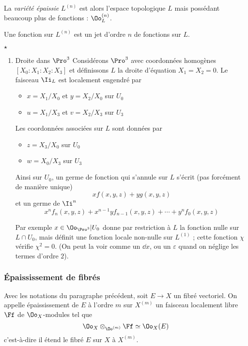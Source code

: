 \documentclass[a4paper]{amsart}
\begin{document}
La \emph{variété épaissie} \(L^{(n)}\) est alors l'espace topologique \(L\) mais possédant beaucoup plus de fonctions : \(\Oo^{(n)}_L\).

Une fonction sur \(L^{(n)}\) est un jet d'ordre \(n\) de fonctions sur \(L\).

{\color{DarkRed}\(\star\)}

\begin{enumerate}
\item Droite dans \(\Pro^3\)
\label{sec:orgd6f4a29}
Considérons \(\Pro^3\) avec coordonnées homogènes \([X_0:X_1:X_2:X_3]\) et définissons \(L\) la droite d'équation \(X_1=X_2= 0\). Le faisceau \(\Ii_L\) est localement engendré par
\begin{itemize}
\item \(x = X_1/X_0\) et \(y = X_2/X_0\) sur \(U_0\)
\item \(u = X_1/X_3\) et \(v = X_2/X_3\) sur \(U_3\)
\end{itemize}
Les coordonnées associées sur \(L\) sont données par
\begin{itemize}
\item \(z = X_3/X_0\) sur \(U_0\)
\item \(w = X_0/X_3\) sur \(U_3\)
\end{itemize}

Ainsi sur \(U_0\), un germe de fonction qui s'annule sur \(L\) s'écrit (pas forcément de manière unique)
\[
xf(x,y,z) + yg(x,y,z)
\]
et un germe de \(\Ii^n\)
\[
x^nf_n(x,y,z) + x^{n-1}yf_{n-1}(x,y,z) + \cdots + y^nf_0(x,y,z)
\]

Par exemple \(x \in \Oo_{\Pro^3}\vert U_0\) donne par restriction à \(L\) la fonction nulle sur \(L \cap U_0\), mais définit une fonction locale non-nulle sur \(L^{(1)}\) ; cette fonction \(\chi\) vérifie \(\chi^2 = 0\). (On peut la voir comme un \(\dd x\), ou un \(\varepsilon\) quand on néglige les termes d'ordre \(2\)).
\end{enumerate}

\subsubsection{Épaississement de fibrés}
\label{sec:orgc4413a8}

Avec les notations du paragraphe précédent, soit \(E \to X\) un fibré vectoriel. On appelle épaississement de \(E\) à l’ordre \(m\) sur \(X^{(m)}\) un faisceau localement libre \(\Ff\) de \(\Oo_X\)-modules tel que
\[
\Oo_X \otimes_{\Oo^{(m)}} \Ff \simeq \Oo_X(E)
\]
c’est-à-dire il étend le fibré \(E\) sur \(X\) à \(X^{(m)}\).
\end{document}
